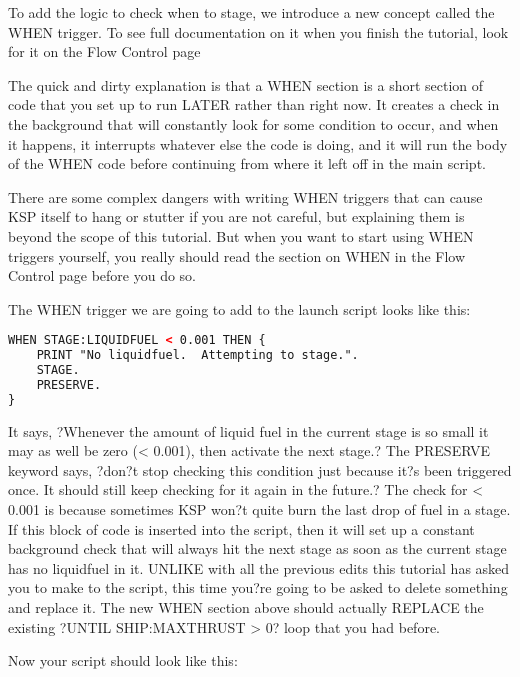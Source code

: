 To add the logic to check when to stage, we introduce a new concept called the WHEN trigger. To see full documentation on it when you finish the tutorial, look for it on the Flow Control page

The quick and dirty explanation is that a WHEN section is a short section of code that you set up to run LATER rather than right now. It creates a check in the background that will constantly look for some condition to occur, and when it happens, it interrupts whatever else the code is doing, and it will run the body of the WHEN code before continuing from where it left off in the main script.

There are some complex dangers with writing WHEN triggers that can cause KSP itself to hang or stutter if you are not careful, but explaining them is beyond the scope of this tutorial. But when you want to start using WHEN triggers yourself, you really should read the section on WHEN in the Flow Control page before you do so.

The WHEN trigger we are going to add to the launch script looks like this:

\begin{lstlisting}[frame=single,language=XML]
WHEN STAGE:LIQUIDFUEL < 0.001 THEN {
    PRINT "No liquidfuel.  Attempting to stage.".
    STAGE.
    PRESERVE.
}
\end{lstlisting} 

It says, ?Whenever the amount of liquid fuel in the current stage is so small it may as well be zero (< 0.001), then activate the next stage.? The PRESERVE keyword says, ?don?t stop checking this condition just because it?s been triggered once. It should still keep checking for it again in the future.? The check for < 0.001 is because sometimes KSP won?t quite burn the last drop of fuel in a stage. If this block of code is inserted into the script, then it will set up a constant background check that will always hit the next stage as soon as the current stage has no liquidfuel in it. UNLIKE with all the previous edits this tutorial has asked you to make to the script, this time you?re going to be asked to delete something and replace it. The new WHEN section above should actually REPLACE the existing ?UNTIL SHIP:MAXTHRUST > 0? loop that you had before.

Now your script should look like this:

